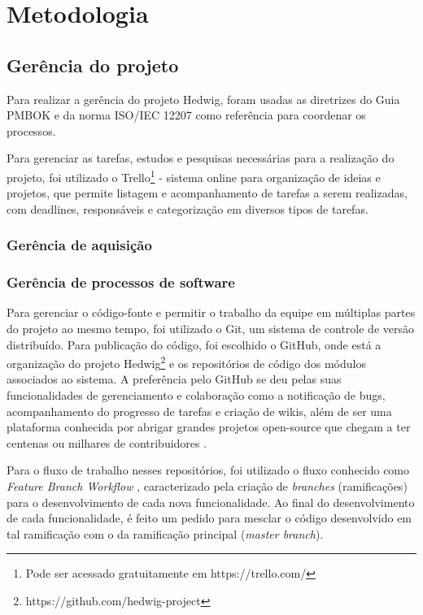 \chapter{Metodologia}

\section{Gerência do projeto}
Para realizar a gerência do projeto Hedwig, foram usadas as diretrizes do Guia PMBOK \cite{pmi} e da norma ISO/IEC 12207 \cite{iso12207} como referência para coordenar os processos.

Para gerenciar as tarefas, estudos e pesquisas necessárias para a realização do projeto, foi utilizado o Trello\footnote{Pode ser acessado gratuitamente em https://trello.com/} - sistema online para organização de ideias e projetos, que permite listagem e acompanhamento de tarefas a serem realizadas, com deadlines, responsáveis e categorização em diversos tipos de tarefas.


\subsection{Gerência de aquisição}

\subsection{Gerência de processos de software}

Para gerenciar o código-fonte e permitir o trabalho da equipe em múltiplas partes do projeto ao mesmo tempo, foi utilizado o Git, um sistema de controle de versão distribuído. Para publicação do código, foi escolhido o GitHub, onde está a organização do projeto Hedwig\footnote{https://github.com/hedwig-project} e os repositórios de código dos módulos associados ao sistema. A preferência pelo GitHub se deu pelas suas funcionalidades de gerenciamento e colaboração como a notificação de bugs, acompanhamento do progresso de tarefas e criação de wikis, além de ser uma plataforma conhecida por abrigar grandes projetos open-source que chegam a ter centenas ou milhares de contribuidores \cite{github}.

Para o fluxo de trabalho nesses repositórios, foi utilizado o fluxo conhecido como \textit{Feature Branch Workflow} \cite{atlassian}, caracterizado pela criação de \textit{branches} (ramificações) para o desenvolvimento de cada nova funcionalidade. Ao final do desenvolvimento de cada funcionalidade, é feito um pedido para mesclar o código desenvolvido em tal ramificação com o da ramificação principal (\textit{master branch}).

